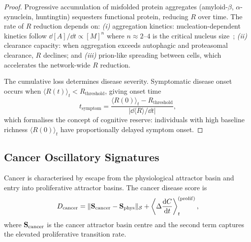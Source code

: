 \begin{proof}
Progressive accumulation of misfolded protein aggregates (amyloid-$\beta$,
$\alpha$-synuclein, huntingtin) sequesters functional protein, reducing $R$
over time.  The rate of $R$ reduction depends on:
\emph{(i)} aggregation kinetics: nucleation-dependent kinetics follow
$\dd[A]/\dd t \propto [M]^n$ where $n \approx 2$--$4$ is the critical
nucleus size~\citep{jumper2021};
\emph{(ii)} clearance capacity: when aggregation exceeds autophagic and
proteasomal clearance, $R$ declines; and
\emph{(iii)} prion-like spreading between cells, which accelerates the
network-wide $R$ reduction.

The cumulative loss determines disease severity.  Symptomatic disease onset
occurs when $\langle R(t)\rangle_t < R_{\mathrm{threshold}}$, giving onset
time
\begin{equation}
  t_{\mathrm{symptom}}
  = \frac{\langle R(0)\rangle_t - R_{\mathrm{threshold}}}{|\dd\langle R\rangle/\dd t|},
  \label{eq:ch07-symptom-onset}
\end{equation}
which formalises the concept of cognitive reserve: individuals with high
baseline richness $\langle R(0)\rangle_t$ have proportionally delayed
symptom onset.
\end{proof}

\subsection{Cancer Oscillatory Signatures}
\label{sec:ch07-cancer}

\begin{theorem}
\label{thm:ch07-cancer}
Cancer is characterised by escape from the physiological attractor basin
and entry into proliferative attractor basins.  The cancer disease score is
\begin{equation}
  D_{\mathrm{cancer}}
  = \|\mathbf{S}_{\mathrm{cancer}} - \mathbf{S}_{\mathrm{phys}}\|_{\mathcal{S}}
    + \left\langle\Delta\frac{\dd C}{\dd t}\right\rangle_t^{(\mathrm{prolif})},
  \label{eq:ch07-cancer}
\end{equation}
where $\mathbf{S}_{\mathrm{cancer}}$ is the cancer attractor basin centre and the
second term captures the elevated proliferative transition rate.
\end{theorem}

